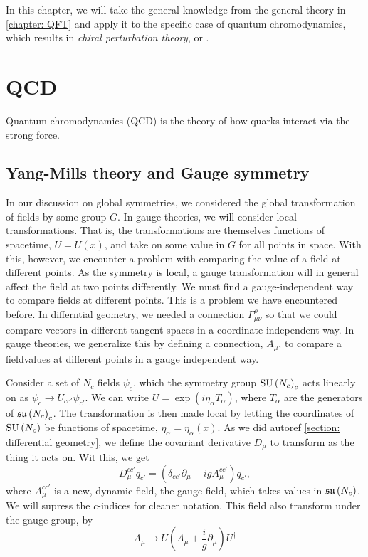 In this chapter, we will take the general knowledge from the general theory in \autoref{chapter: QFT} and apply it to the specific case of quantum chromodynamics, which results in \emph{chiral perturbation theory}, or \chpt.

\section{QCD}

Quantum chromodynamics (QCD) is the theory of how quarks interact via the strong force.


\subsection{Yang-Mills theory and Gauge symmetry}


In our discussion on global symmetries, we considered the global transformation of fields by some group $G$.
In gauge theories, we will consider local transformations.
That is, the transformations are themselves functions of spacetime, $U = U(x)$, and take on some value in $G$ for all points in space.
With this, however, we encounter a problem with comparing the value of a field at different points.
As the symmetry is local, a gauge transformation will in general affect the field  at two points differently.
We must find a gauge-independent way to compare fields at different points.
This is a problem we have encountered before.
In differntial geometry, we needed a connection $\Gamma^\rho_{\mu \nu}$ so that we could compare vectors in different tangent spaces in a coordinate independent way.
In gauge theories, we generalize this by defining a connection, $A_\mu$, to compare a fieldvalues at different points in a gauge independent way.

Consider a set of $N_c$ fields $\psi_c$, which the symmetry group $\text{SU}\left(N_c\right)_c$ acts linearly on as $\psi_c \rightarrow U_{cc'} \psi_{c'}$.
We can write $U = \exp(i \eta_\alpha T_\alpha)$, where $T_\alpha$ are the generators of $\mathfrak{su}\left(N_c\right)_c$.
The transformation is then made local by letting the coordinates of $\text{SU}\left(N_c\right)$ be functions of spacetime, $\eta_\alpha = \eta_\alpha(x)$.
As we did autoref \autoref{section: differential geometry}, we define the covariant derivative $D_\mu$ to transform as the thing it acts on.
Wit this, we get
%
\begin{equation}
    D_\mu^{cc'} q_{c'} = (\delta_{cc'}\partial_\mu - i g A_\mu^{cc'} )q_{c'},
\end{equation}
%
where $A_\mu^{cc'}$ is a new, dynamic field, the gauge field, which takes values in $\mathfrak{su}\left(N_c\right)$.
We will supress the $c$-indices for cleaner notation.
This field also transform under the gauge group, by
%
\begin{equation}
    \label{Gauge transformation gauge field}
    A_\mu\rightarrow U \left(A_\mu + \frac{i}{g} \partial_\mu\right) U^\dagger
\end{equation}
%

